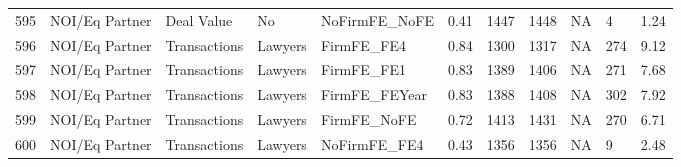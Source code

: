 \begin{table}[ht]
\begin{tabular}{rllllllllll}
  595 & NOI/Eq Partner & Deal Value & No & NoFirmFE\_NoFE & 0.41 & 1447 & 1448 & NA & 4 & 1.24 \\ 
  596 & NOI/Eq Partner & Transactions & Lawyers & FirmFE\_FE4 & 0.84 & 1300 & 1317 & NA & 274 & 9.12 \\ 
  597 & NOI/Eq Partner & Transactions & Lawyers & FirmFE\_FE1 & 0.83 & 1389 & 1406 & NA & 271 & 7.68 \\ 
  598 & NOI/Eq Partner & Transactions & Lawyers & FirmFE\_FEYear & 0.83 & 1388 & 1408 & NA & 302 & 7.92 \\ 
  599 & NOI/Eq Partner & Transactions & Lawyers & FirmFE\_NoFE & 0.72 & 1413 & 1431 & NA & 270 & 6.71 \\ 
  600 & NOI/Eq Partner & Transactions & Lawyers & NoFirmFE\_FE4 & 0.43 & 1356 & 1356 & NA & 9 & 2.48 \\ 
   \hline
\end{tabular}
\end{table}
